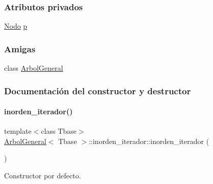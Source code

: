 \subsubsection*{Atributos privados}
\begin{DoxyCompactItemize}
\item 
\hyperlink{classArbolGeneral_a12cc1b74a9095d89bc7334290d332f7a}{Nodo} \hyperlink{classArbolGeneral_1_1inorden__iterador_a77d9424a41cf406909fe131c11ccc856}{p}
\end{DoxyCompactItemize}
\subsubsection*{Amigas}
\begin{DoxyCompactItemize}
\item 
class \hyperlink{classArbolGeneral_1_1inorden__iterador_a9c06e31b7c3e0d4ee5b03003d32935a5}{Arbol\+General}
\end{DoxyCompactItemize}


\subsubsection{Documentación del constructor y destructor}
\hypertarget{classArbolGeneral_1_1inorden__iterador_aff58cfa3f1c33c0c9c8c08f1d0f3cc8f}{}\label{classArbolGeneral_1_1inorden__iterador_aff58cfa3f1c33c0c9c8c08f1d0f3cc8f} 
\paragraph{\texorpdfstring{inorden\+\_\+iterador()}{inorden\_iterador()}\hspace{0.1cm}{\footnotesize\ttfamily [1/3]}}
{\footnotesize\ttfamily template$<$class Tbase$>$ \\
\hyperlink{classArbolGeneral}{Arbol\+General}$<$ Tbase $>$\+::inorden\+\_\+iterador\+::inorden\+\_\+iterador (\begin{DoxyParamCaption}{ }\end{DoxyParamCaption})\hspace{0.3cm}{\ttfamily [inline]}}



Constructor por defecto. 

\hypertarget{classArbolGeneral_1_1inorden__iterador_a6ddfc67535be2870b508633b75639698}{}\label{classArbolGeneral_1_1inorden__iterador_a6ddfc67535be2870b508633b75639698} 
